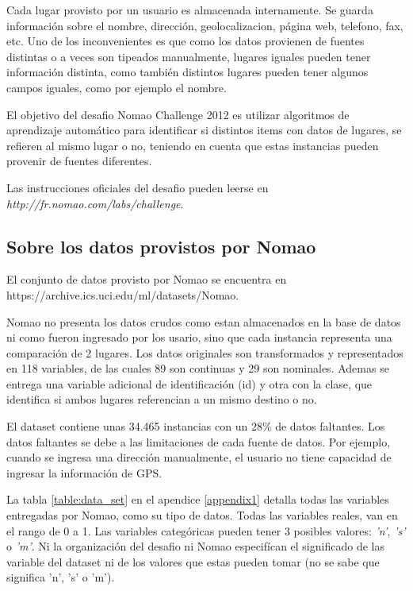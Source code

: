 \documentclass[journal]{IEEEtran}
\begin{document}
Cada lugar provisto por un usuario es almacenada internamente. Se guarda
información sobre el nombre, dirección, geolocalizacion, página web,
telefono, fax, etc. Uno de los inconvenientes es que como los datos
provienen de fuentes distintas o a veces son tipeados manualmente,
lugares iguales pueden tener información distinta, como también
distintos lugares pueden tener algunos campos iguales, como por 
ejemplo el nombre.

El objetivo del desafio Nomao Challenge 2012 es utilizar 
algoritmos de aprendizaje automático para identificar si 
distintos items con datos de lugares, se refieren al mismo
lugar o no, teniendo en cuenta que estas instancias
pueden provenir de fuentes diferentes.

Las instrucciones oficiales del desafio pueden leerse en 
\textit{http://fr.nomao.com/labs/challenge}.

\subsection{Sobre los datos provistos por Nomao}

El conjunto de datos provisto por Nomao se encuentra en
https://archive.ics.uci.edu/ml/datasets/Nomao. 

Nomao no presenta los datos crudos como estan almacenados en la 
base de datos ni como fueron ingresado por los usario, sino que  
cada instancia representa una comparación de 
2 lugares. Los datos originales son transformados y representados
en 118 variables, de las cuales 89 son continuas y 29 son
nominales. Ademas se entrega una variable adicional de identificación (id) y
otra con la clase, que identifica si ambos lugares referencian a un mismo
destino o no. 

El dataset contiene unas 34.465 instancias con un 28\% de datos faltantes.
Los datos faltantes se debe a las limitaciones de cada fuente de datos. Por
ejemplo, cuando se ingresa una dirección manualmente, el usuario no tiene
capacidad de ingresar la información de GPS.

La tabla \ref{table:data_set} en el apendice \ref{appendix1} detalla todas las variables entregadas por 
Nomao, como su tipo de datos. Todas las variables reales, van en el rango de 0 a 1. Las variables
categóricas pueden tener 3 posibles valores: \textit{'n'}, \textit{'s'} 
o \textit{'m'}. Ni la organización del desafio ni Nomao especifícan 
el significado de las variable del dataset ni de los valores
que estas pueden tomar (no se sabe que significa 'n', 's' o 'm').
\end{document}
